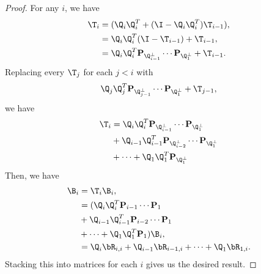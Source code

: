 \begin{proof}
    For any $i$, we have
    \begin{align}
        \T_i &= (\Q_i \Q_i^T + (\I - \Q_i \Q_i^T) \T_{i-1}), \\
        &= \Q_i \Q_i^T(\I - \T_{i-1}) + \T_{i-1}, \\
        &= \Q_i \Q_i^T\mathbf{P}_{\Q_{i-1}^\perp}\cdots \mathbf{P}_{\Q_1^\perp} + \T_{i-1}.
    \end{align}
    Replacing every $\T_j$ for each $j < i$ with 
    \begin{equation}
        \Q_j \Q_j^T\mathbf{P}_{\Q_{j-1}^\perp}\cdots \mathbf{P}_{\Q_1^\perp}+ \T_{j-1},
    \end{equation}
    we have
    \begin{align}
    \begin{aligned}
        \T_i &= \Q_i \Q_i^T\mathbf{P}_{\Q_{i-1}^\perp}\cdots \mathbf{P}_{\Q_{1}^\perp} \\
        &+ \Q_{i-1} \Q_{i-1}^T\mathbf{P}_{\Q_{i-2}^\perp}\cdots \mathbf{P}_{\Q_{1}^\perp} \\
        &+ \cdots +\Q_1 \Q_1^T \mathbf{P}_{\Q_{1}^\perp}
    \end{aligned}
    \end{align}
    Then, we have 
    \begin{align}
    \begin{aligned}
        \B_i & = \T_i \B_i,\\
        &= (\Q_i \Q_i^T\mathbf{P}_{i-1}\cdots \mathbf{P}_1 \\
        &+ \Q_{i-1} \Q_{i-1}^T\mathbf{P}_{i-2}\cdots \mathbf{P}_1 \\
        &+ \cdots +\Q_1 \Q_1^T \mathbf{P}_1)\B_i,\\
        &= \Q_i \bR_{i,i} + \Q_{i-1} \bR_{i-1,i} + \cdots +\Q_1 \bR_{1,i}.
    \end{aligned}
    \end{align}
    Stacking this into matrices for each $i$ gives us the desired result.


    
\end{proof}


